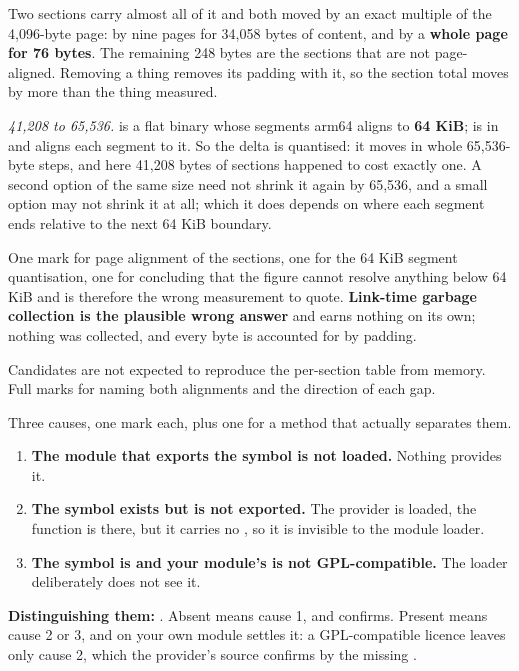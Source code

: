 \noindent Two sections carry almost all of it and both moved by an exact multiple of the 4,096-byte
page:  by nine pages for 34,058 bytes of content, and  by a \textbf{whole
page for 76 bytes}. The remaining 248 bytes are the sections that are not page-aligned. Removing a
thing removes its padding with it, so the section total moves by more than the thing measured.

\emph{41,208 to 65,536.}  is a flat binary whose segments arm64 aligns to \textbf{64
KiB};  is  in  and
 aligns each segment to it. So the  delta is quantised: it moves in whole 65,536-byte
steps, and here 41,208 bytes of sections happened to cost exactly one. A second option of the same
size need not shrink it again by 65,536, and a small option may not shrink it at all; which it does
depends on where each segment ends relative to the next 64 KiB boundary.

One mark for page alignment of the sections, one for the 64 KiB segment quantisation, one for
concluding that the  figure cannot resolve anything below 64 KiB and is therefore the
wrong measurement to quote. \textbf{Link-time garbage collection is the plausible wrong answer} and
earns nothing on its own; nothing was collected, and every byte is accounted for by padding.

Candidates are not expected to reproduce the per-section table from memory. Full marks for naming
both alignments and the direction of each gap.


Three causes, one mark each, plus one for a method that actually separates them.
\begin{enumerate}
  \item \textbf{The module that exports the symbol is not loaded.} Nothing provides it.
  \item \textbf{The symbol exists but is not exported.} The provider is loaded, the function is
    there, but it carries no , so it is invisible to the module loader.
  \item \textbf{The symbol is  and your module's  is
    not GPL-compatible.} The loader deliberately does not see it.
\end{enumerate}
\textbf{Distinguishing them:} . Absent means cause 1, and
 confirms. Present means cause 2 or 3, and  on your own module
settles it: a GPL-compatible licence leaves only cause 2, which the provider's source confirms by
the missing .

